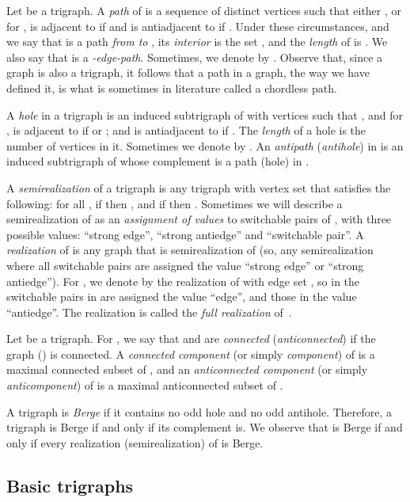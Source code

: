 \documentclass[11 pt] {article}
\begin{document}
Let  be a trigraph. A \emph{path}  of  is a sequence of
distinct vertices  such that either , or for ,  is adjacent to  if  and
 is antiadjacent to  if . Under these
circumstances,  and we say that  is a
path {\em from  to }, its {\em interior} is the set
, and the {\em length} of  is
. We also say that  is a \emph{-edge-path}. Sometimes,
we denote  by .  Observe that, since a graph is also a
trigraph, it follows that a path in a graph, the way we have defined
it, is what is sometimes in literature called a chordless path.


A {\em hole} in a trigraph  is an induced subtrigraph  of 
with vertices  such that , and for ,  is adjacent to  if  or
; and  is antiadjacent to  if . The
{\em length} of a hole is the number of vertices in it. Sometimes we
denote  by . An {\em antipath} ({\em antihole})
in  is an induced subtrigraph of  whose complement is a path
(hole) in .


A {\em semirealization} of a trigraph  is any trigraph  with
vertex set  that satisfies the following: for all , if  then , and
if  then .  Sometimes we will describe
a semirealization of  as an {\em assignment of values} to
switchable pairs of , with three possible values: ``strong edge'',
``strong antiedge'' and ``switchable pair''.  A {\em realization} of
 is any graph that is semirealization of  (so, any
semirealization where all switchable pairs are assigned the value
``strong edge'' or ``strong antiedge'').  For , we denote by  the realization of  with edge set ,  so in  the switchable pairs in  are assigned
the value ``edge'', and those in  the value
``antiedge''. The realization  is called the {\em
  full realization} of~.

Let  be a trigraph. For , we say that  and
 are {\em connected} ({\em anticonnected}) if the graph
 () is
connected. A {\em connected component} (or simply \emph{component}) of
 is a maximal connected subset of , and an {\em anticonnected
component} (or simply \emph{anticomponent}) of  is a maximal
anticonnected subset of .


A trigraph  is {\em Berge} if it contains no odd hole and no odd
antihole. Therefore, a trigraph is Berge if and only if its complement
is. We observe that  is Berge if and only if every realization
(semirealization) of  is Berge.


\subsection{Basic trigraphs}
\end{document}
